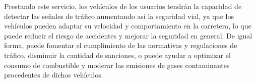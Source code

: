 Prestando este servicio, los vehículos de los usuarios tendrán la capacidad de detectar las señales de tráfico aumentando así la seguridad vial, ya que los vehículos pueden adaptar su velocidad y comportamiento en la carretera, lo que puede reducir el riesgo de accidentes y mejorar la seguridad en general. De igual forma, puede fomentar el cumplimiento de las normativas y regulaciones de tráfico, disminuir la cantidad de sanciones, o puede ayudar a optimizar el consumo de combustible y moderar las emisiones de gases contaminantes procedentes de dichos vehículos.\\


